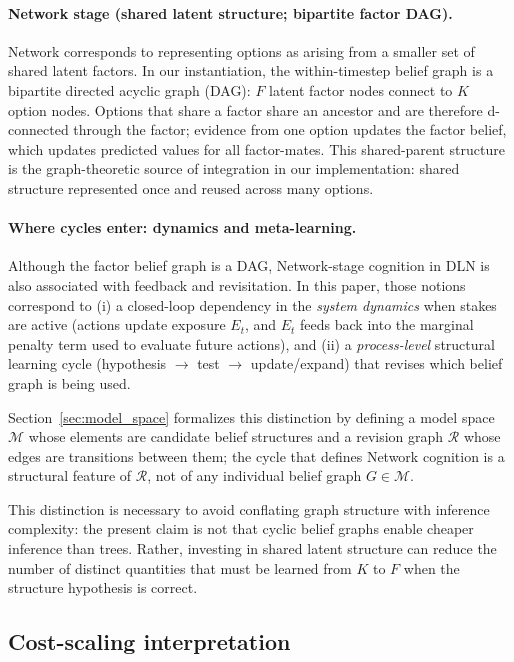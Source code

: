 \documentclass[11pt]{article}
\begin{document}
\paragraph{Network stage (shared latent structure; bipartite factor DAG).}
Network corresponds to representing options as arising from a smaller set of shared latent factors.
In our instantiation, the within-timestep belief graph is a bipartite directed acyclic graph (DAG): $F$ latent factor nodes connect to $K$ option nodes.
Options that share a factor share an ancestor and are therefore d-connected through the factor; evidence from one option updates the factor belief, which updates predicted values for all factor-mates.
This shared-parent structure is the graph-theoretic source of integration in our implementation: shared structure represented once and reused across many options.

\paragraph{Where cycles enter: dynamics and meta-learning.}
Although the factor belief graph is a DAG, Network-stage cognition in DLN is also associated with feedback and revisitation.
In this paper, those notions correspond to (i) a closed-loop dependency in the \emph{system dynamics} when stakes are active (actions update exposure $E_t$, and $E_t$ feeds back into the marginal penalty term used to evaluate future actions), and (ii) a \emph{process-level} structural learning cycle (hypothesis $\rightarrow$ test $\rightarrow$ update/expand) that revises which belief graph is being used.

Section~\ref{sec:model_space} formalizes this distinction by defining a model
space $\mathcal{M}$ whose elements are candidate belief structures and a
revision graph $\mathcal{R}$ whose edges are transitions between them; the cycle
that defines Network cognition is a structural feature of $\mathcal{R}$, not of
any individual belief graph $G\in\mathcal{M}$.

This distinction is necessary to avoid conflating graph structure with inference complexity: the present claim is not that cyclic belief graphs enable cheaper inference than trees. Rather, investing in shared latent structure can reduce the number of distinct quantities that must be learned from $K$ to $F$ when the structure hypothesis is correct.

\subsection{Cost-scaling interpretation}
\end{document}
